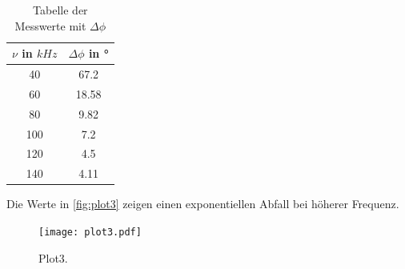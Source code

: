 \begin{table}[htb]
  \centering
  \caption{Tabelle der Messwerte mit \(\Delta\phi\)}
  \label{tab:tab4}
  \begin{tabular}{c c}
    \toprule
    $\nu$ in $kHz$ & $\Delta\phi$ in °\\
    \midrule
    40 & 67.2\\
    60 & 18.58\\
    80 & 9.82\\
    100 & 7.2\\
    120 & 4.5\\
    140 & 4.11\\
    \bottomrule
  \end{tabular}
\end{table}

Die Werte in \autoref{fig:plot3} zeigen einen exponentiellen Abfall bei höherer Frequenz.\\

\begin{figure}[htb]
  \centering
  \texttt{[image: plot3.pdf]}
  \caption{Plot3.}
  \label{fig:plot3}
\end{figure}


